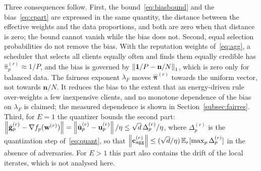 \begin{revblock}
Three consequences follow. First, the bound~\eqref{eq:biasbound} and the bias~\eqref{eq:cpart} are expressed in the same quantity, the distance between the effective weights and the data proportions, and both are zero when that distance is zero; the bound cannot vanish while the bias does not. Second, equal selection probabilities do not remove the bias. With the reputation weights of~\eqref{eq:agg}, a scheduler that selects all clients equally often and finds them equally credible has $\hat\pi_p^{(r)}\approx 1/P$, and the bias is governed by $\left\lVert \mathbf{1}/P-\mathbf{n}/N \right\rVert_1$, which is zero only for balanced data. The fairness exponent $\lambda_F$ moves $\hat{\boldsymbol{\pi}}^{(r)}$ towards the uniform vector, not towards $\mathbf{n}/N$. It reduces the bias to the extent that an energy-driven rule over-weights a few inexpensive clients, and no monotone dependence of the bias on $\lambda_F$ is claimed; the measured dependence is shown in Section~\ref{subsec:fairres}. Third, for $E=1$ the quantizer bounds the second part: $\left\lVert \hat{\mathbf{g}}_p^{(r)}-\nabla f_p(\mathbf{w}^{(r)}) \right\rVert=\left\lVert \hat{\mathbf{u}}_p^{(r)}-\mathbf{u}_p^{(r)} \right\rVert/\eta\le\sqrt{d}\,\Delta_p^{(r)}/\eta$, where $\Delta_p^{(r)}$ is the quantization step of~\eqref{eq:quant}, so that $\left\lVert \mathbf{c}_{\mathrm{agg}}^{(r)} \right\rVert\le(\sqrt{d}/\eta)\,\mathbb{E}_r[\max_{p}\Delta_p^{(r)}]$ in the absence of adversaries. For $E>1$ this part also contains the drift of the local iterates, which is not analysed here.\end{revblock}
